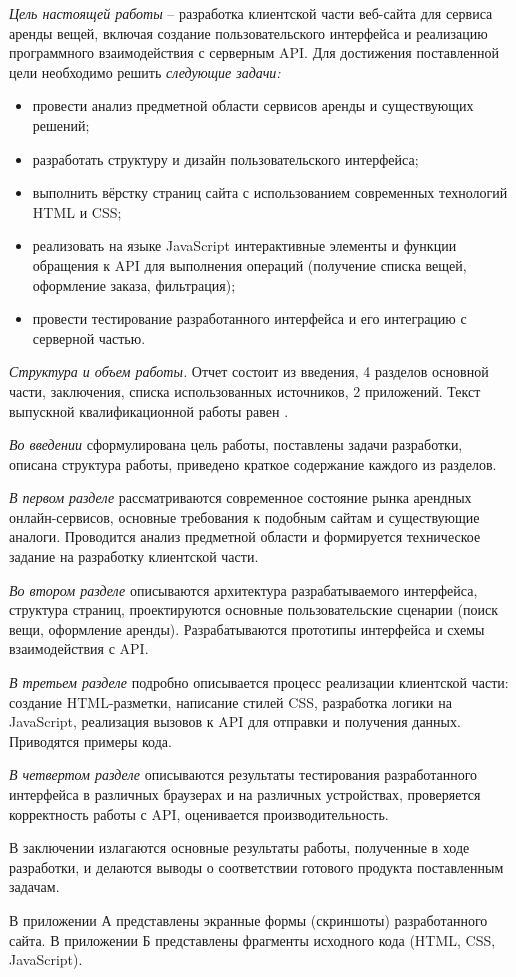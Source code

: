 \emph{Цель настоящей работы} – разработка клиентской части веб-сайта для сервиса аренды вещей, включая создание пользовательского интерфейса и реализацию программного взаимодействия с серверным API. Для достижения поставленной цели необходимо решить \emph{следующие задачи:}
\begin{itemize}
\item провести анализ предметной области сервисов аренды и существующих решений;
\item разработать структуру и дизайн пользовательского интерфейса;
\item выполнить вёрстку страниц сайта с использованием современных технологий HTML и CSS;
\item реализовать на языке JavaScript интерактивные элементы и функции обращения к API для выполнения операций (получение списка вещей, оформление заказа, фильтрация);
\item провести тестирование разработанного интерфейса и его интеграцию с серверной частью.
\end{itemize}

\emph{Структура и объем работы.} Отчет состоит из введения, 4 разделов основной части, заключения, списка использованных источников, 2 приложений. Текст выпускной квалификационной работы равен .

\emph{Во введении} сформулирована цель работы, поставлены задачи разработки, описана структура работы, приведено краткое содержание каждого из разделов.

\emph{В первом разделе} рассматриваются современное состояние рынка арендных онлайн-сервисов, основные требования к подобным сайтам и существующие аналоги. Проводится анализ предметной области и формируется техническое задание на разработку клиентской части.

\emph{Во втором разделе} описываются архитектура разрабатываемого интерфейса, структура страниц, проектируются основные пользовательские сценарии (поиск вещи, оформление аренды). Разрабатываются прототипы интерфейса и схемы взаимодействия с API.

\emph{В третьем разделе} подробно описывается процесс реализации клиентской части: создание HTML-разметки, написание стилей CSS, разработка логики на JavaScript, реализация вызовов к API для отправки и получения данных. Приводятся примеры кода.

\emph{В четвертом разделе} описываются результаты тестирования разработанного интерфейса в различных браузерах и на различных устройствах, проверяется корректность работы с API, оценивается производительность.

В заключении излагаются основные результаты работы, полученные в ходе разработки, и делаются выводы о соответствии готового продукта поставленным задачам.

В приложении А представлены экранные формы (скриншоты) разработанного сайта. 
В приложении Б представлены фрагменты исходного кода (HTML, CSS, JavaScript).
